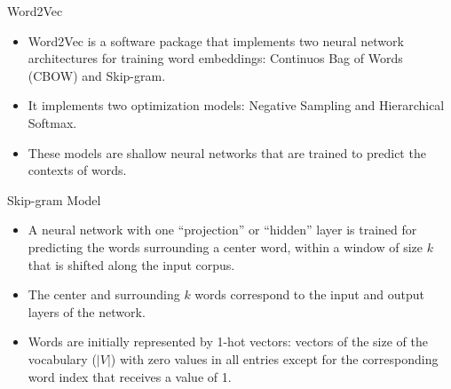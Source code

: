 \documentclass[handout]{beamer}
\begin{document}
\begin{frame}{Word2Vec}
\begin{scriptsize}
\begin{itemize}
\item Word2Vec is a software package that implements two neural network architectures for training word embeddings:  Continuos Bag of Words (CBOW) and Skip-gram.
\item It implements two  optimization models: Negative Sampling and Hierarchical Softmax.
\item These models are shallow neural networks that are trained to predict the contexts of words.
\end{itemize}
\end{scriptsize}
\end{frame}



\begin{frame}{Skip-gram Model}
\begin{scriptsize}
\begin{itemize}
\item A neural network with one ``projection'' or ``hidden'' layer is trained for predicting the words surrounding a center word, within a window  of size $k$ that is shifted along the input corpus. 
\item The center and surrounding $k$ words correspond to the input and output layers of the network.
\item Words are initially represented by 1-hot vectors: vectors of the size of the vocabulary ($|V|$) with zero values in all entries except for the corresponding word index that receives a value of 1. 
\end{itemize}
\end{scriptsize}

\end{frame}
\end{document}
